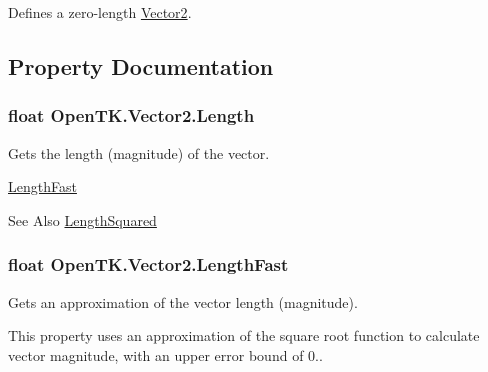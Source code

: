 Defines a zero-\/length \hyperlink{struct_open_t_k_1_1_vector2}{Vector2}. 



\subsection{Property Documentation}
\hypertarget{struct_open_t_k_1_1_vector2_a4e59d4f3f2a003e47705241fb3018023}{
\subsubsection[{Length}]{\setlength{\rightskip}{0pt plus 5cm}float Open\-T\-K.\-Vector2.\-Length\hspace{0.3cm}{\ttfamily [get]}}}\label{struct_open_t_k_1_1_vector2_a4e59d4f3f2a003e47705241fb3018023}


Gets the length (magnitude) of the vector. 

\hyperlink{struct_open_t_k_1_1_vector2_a3ca5088bcfc730ee241e3851ac49eab4}{Length\-Fast} \begin{DoxySeeAlso}{See Also}
\hyperlink{struct_open_t_k_1_1_vector2_aba3ddfbb5955550d76df2b9f1bed585c}{Length\-Squared}


\end{DoxySeeAlso}
\hypertarget{struct_open_t_k_1_1_vector2_a3ca5088bcfc730ee241e3851ac49eab4}{
\subsubsection[{Length\-Fast}]{\setlength{\rightskip}{0pt plus 5cm}float Open\-T\-K.\-Vector2.\-Length\-Fast\hspace{0.3cm}{\ttfamily [get]}}}\label{struct_open_t_k_1_1_vector2_a3ca5088bcfc730ee241e3851ac49eab4}


Gets an approximation of the vector length (magnitude). 

This property uses an approximation of the square root function to calculate vector magnitude, with an upper error bound of 0.. 

